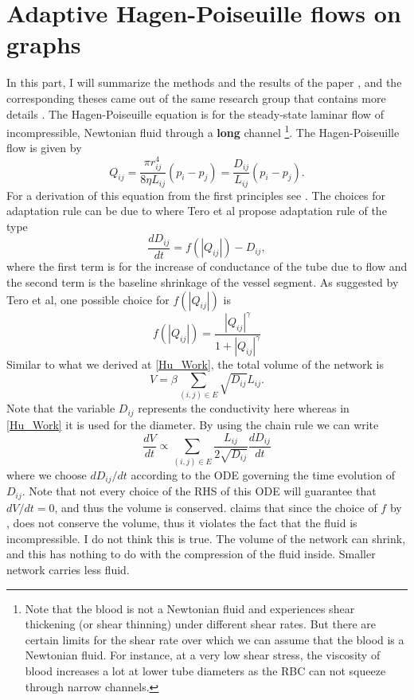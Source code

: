\documentclass[10pt,a4paper,twocolumn]{article}
\begin{document}
	\section{Adaptive Hagen-Poiseuille flows on graphs}
	In this part, I will summarize the methods and the results of the paper \cite{Almeida2022}, and the corresponding theses came out of the same research group that contains more details \cite{Valente2023,Almeida2023}. The Hagen-Poiseuille equation is for the steady-state laminar flow of incompressible, Newtonian fluid through a \textbf{long} channel \footnote{Note that the blood is not a Newtonian fluid and experiences shear thickening (or shear thinning) under different shear rates. But there are certain limits for the shear rate over which we can assume that the blood is a Newtonian fluid. For instance, at a very low shear stress, the viscosity of blood increases a lot at lower tube diameters as the RBC can not squeeze through narrow channels.}. The Hagen-Poiseuille flow is given by
	\[ Q_{ij} = \frac{\pi r_{ij}^4}{8\eta L_{ij}}(p_i - p_j) = \frac{D_{ij}}{L_{ij}}(p_i - p_j). \]
	For a derivation of this equation from the first principles see \cite{tecscience2020}. The choices for adaptation rule can be due to \cite{Tero2010} where Tero et al propose adaptation rule of the type
	\[ \frac{d D_{ij}}{dt} = f(|Q_{ij}|) - D_{ij}, \]
	where the first term is for the increase of conductance of the tube due to flow and the second term is the baseline shrinkage of the vessel segment. As suggested by Tero et al, one possible choice for $ f(|Q_{ij}|) $ is 
	\[ f(|Q_{ij}|) = \frac{|Q_{ij}|^\gamma}{1+|Q_{ij}|^\gamma} \]
	Similar to what we derived at \autoref{Hu_Work}, the total volume of the network is
	\[ V = \beta \sum_{(i,j)\in E} \sqrt{D_{ij}}L_{ij}. \]
	Note that the variable $ D_{ij} $ represents the conductivity here whereas in \autoref{Hu_Work} it is used for the diameter. By using the chain rule we can write
	\[ \frac{d V}{dt} \propto \sum_{(i,j)\in E} \frac{L_{ij}}{2\sqrt{D_{ij}}} \frac{dD_{ij}}{dt} \]
	where we choose $ d D_{ij}/dt $ according to the ODE governing the time evolution of $ D_{ij} $. Note that not every choice of the RHS of this ODE will guarantee that $ dV/dt = 0 $, and thus the volume is conserved. \cite{Almeida2023} claims that since the choice of $ f $ by \cite{Tero2010}, does not conserve the volume, thus it violates the fact that the fluid is incompressible. I do not think this is true. The volume of the network can shrink, and this has nothing to do with the compression of the fluid inside. Smaller network carries less fluid.
	
\end{document}
